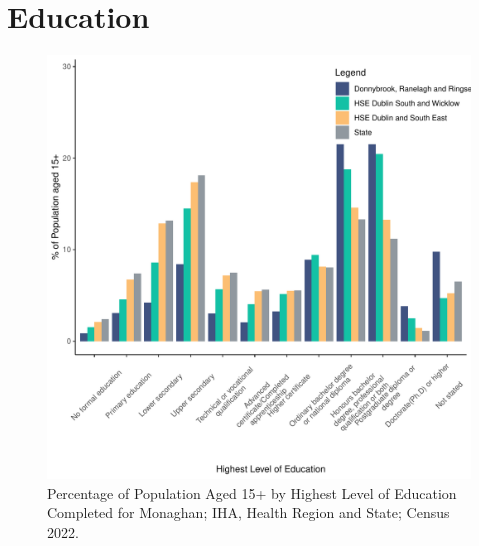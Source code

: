 \documentclass{article}
\begin{document}
\section{Education}\label{sect:Edu}
\begin{figure}[H]
	\centering
	\includegraphics[width = 120mm]{../figures/EduED.pdf}
	\caption{Percentage of Population Aged 15+ by Highest Level of Education Completed for Monaghan; IHA, Health Region and State; Census 2022.}
	\label{fig:vbnv}
	\end{figure}
\end{document}

